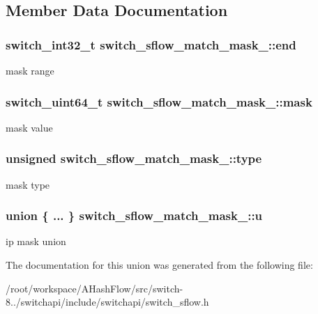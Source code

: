 \subsection{Member Data Documentation}
\hypertarget{unionswitch__sflow__match__mask___ac8e69eb65bc6c38e4ffe165f36098054}{
\subsubsection[{end}]{\setlength{\rightskip}{0pt plus 5cm}switch\+\_\+int32\+\_\+t switch\+\_\+sflow\+\_\+match\+\_\+mask\+\_\+\+::end}}\label{unionswitch__sflow__match__mask___ac8e69eb65bc6c38e4ffe165f36098054}
mask range \hypertarget{unionswitch__sflow__match__mask___acd49bba7f7f1189ec4613a6f487186a7}{
\subsubsection[{mask}]{\setlength{\rightskip}{0pt plus 5cm}switch\+\_\+uint64\+\_\+t switch\+\_\+sflow\+\_\+match\+\_\+mask\+\_\+\+::mask}}\label{unionswitch__sflow__match__mask___acd49bba7f7f1189ec4613a6f487186a7}
mask value \hypertarget{unionswitch__sflow__match__mask___ad9f364296d71b6888b190d247ae9abb3}{
\subsubsection[{type}]{\setlength{\rightskip}{0pt plus 5cm}unsigned switch\+\_\+sflow\+\_\+match\+\_\+mask\+\_\+\+::type}}\label{unionswitch__sflow__match__mask___ad9f364296d71b6888b190d247ae9abb3}
mask type \hypertarget{unionswitch__sflow__match__mask___ab67bedea67389b5c16d654992af27b94}{
\subsubsection[{u}]{\setlength{\rightskip}{0pt plus 5cm}union \{ ... \}   switch\+\_\+sflow\+\_\+match\+\_\+mask\+\_\+\+::u}}\label{unionswitch__sflow__match__mask___ab67bedea67389b5c16d654992af27b94}
ip mask union 

The documentation for this union was generated from the following file\+:\begin{DoxyCompactItemize}
\item 
/root/workspace/\+A\+Hash\+Flow/src/switch-\/8../switchapi/include/switchapi/switch\+\_\+sflow.\+h\end{DoxyCompactItemize}
